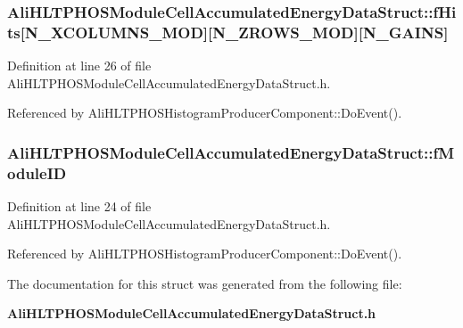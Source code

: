 \subsubsection{ {\bf Ali\-HLTPHOSModule\-Cell\-Accumulated\-Energy\-Data\-Struct::f\-Hits}[N\_\-XCOLUMNS\_\-MOD][N\_\-ZROWS\_\-MOD][N\_\-GAINS]}\label{structAliHLTPHOSModuleCellAccumulatedEnergyDataStruct_o2}




Definition at line 26 of file Ali\-HLTPHOSModule\-Cell\-Accumulated\-Energy\-Data\-Struct.h.

Referenced by Ali\-HLTPHOSHistogram\-Producer\-Component::Do\-Event().
\subsubsection{ {\bf Ali\-HLTPHOSModule\-Cell\-Accumulated\-Energy\-Data\-Struct::f\-Module\-ID}}\label{structAliHLTPHOSModuleCellAccumulatedEnergyDataStruct_o0}




Definition at line 24 of file Ali\-HLTPHOSModule\-Cell\-Accumulated\-Energy\-Data\-Struct.h.

Referenced by Ali\-HLTPHOSHistogram\-Producer\-Component::Do\-Event().

The documentation for this struct was generated from the following file:\begin{CompactItemize}
\item 
{\bf Ali\-HLTPHOSModule\-Cell\-Accumulated\-Energy\-Data\-Struct.h}\end{CompactItemize}
